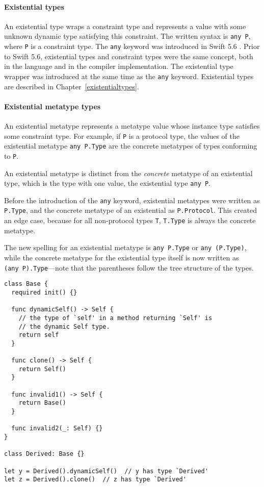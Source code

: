 \documentclass[a4paper,headsepline,bibliography=totoc,toc=flat,fleqn,twoside=semi]{scrbook}
\theoremstyle{definition}
\theoremstyle{definition}
\theoremstyle{definition}
\begin{document}
\paragraph{Existential types}
An existential type wraps a constraint type and represents a value with some unknown dynamic type satisfying this constraint. The written syntax is \texttt{any~P}, where \texttt{P} is a constraint type. The \texttt{any} keyword was introduced in Swift 5.6 \cite{se0355}. Prior to Swift 5.6, existential types and constraint types were the same concept, both in the language and in the compiler implementation. The existential type wrapper was introduced at the same time as the \texttt{any} keyword. Existential types are described in Chapter~\ref{existentialtypes}.

\paragraph{Existential metatype types}
An existential metatype represents a metatype value whose instance type satisfies some constraint type. For example, if \texttt{P} is a protocol type, the values of the existential metatype \texttt{any P.Type} are the concrete metatypes of types conforming to \texttt{P}.

An existential metatype is distinct from the \emph{concrete} metatype of an existential type, which is the type with one value, the existential type \texttt{any~P}.

Before the introduction of the \texttt{any} keyword, existential metatypes were written as \texttt{P.Type}, and the concrete metatype of an existential as \texttt{P.Protocol}. This created an edge case, because for all non-protocol types \texttt{T}, \texttt{T.Type} is always the concrete metatype.

The new spelling for an existential metatype is \texttt{any P.Type} or \texttt{any (P.Type)}, while the concrete metatype for the existential type itself is now written as \texttt{(any~P).Type}---note that the parentheses follow the tree structure of the types.

\begin{listing}\label{dynamic self example}
\begin{Verbatim}
class Base {
  required init() {}
  
  func dynamicSelf() -> Self {
    // the type of `self' in a method returning `Self' is
    // the dynamic Self type.
    return self
  }

  func clone() -> Self {
    return Self()
  }
  
  func invalid1() -> Self {
    return Base()
  }
  
  func invalid2(_: Self) {}
}

class Derived: Base {}

let y = Derived().dynamicSelf()  // y has type `Derived'
let z = Derived().clone()  // z has type `Derived'
\end{Verbatim}
\end{listing}
\end{document}
